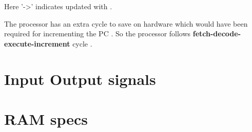 \documentclass[11pt]{article}
\begin{document}
Here '->' indicates updated with .

The processor has an extra cycle to save on hardware which would have been required for incrementing the PC . So the processor follows \textbf{fetch-decode-execute-increment} cycle .   

\section{Input Output signals}
\section{RAM specs}
\end{document}
